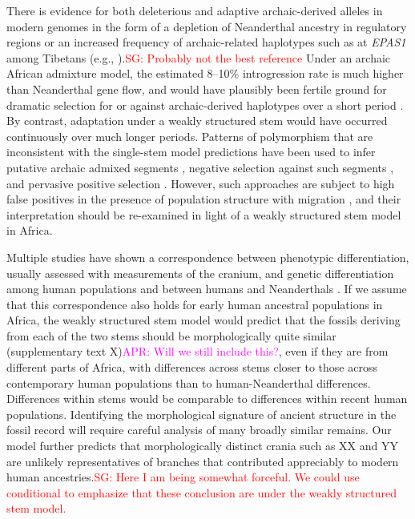 \documentclass[]{article}
\newcommand{\sgcomment}[1]{{\textcolor{red}{SG: #1}}}
\newcommand{\aprcomment}[1]{{\textcolor{magenta}{APR: #1}}}
\begin{document}
There is evidence for both deleterious and adaptive archaic-derived alleles in
modern genomes in the form of a depletion of Neanderthal ancestry in regulatory
regions \citep{Petr2019-xo} or an increased frequency of archaic-related
haplotypes such as at \emph{EPAS1} among Tibetans (e.g.,
\citet{Zhang2021-xx}).\sgcomment{Probably not the best reference} Under an
archaic African admixture model, the estimated 8--10\% introgression rate is
much higher than Neanderthal gene flow, and would have plausibly been fertile
ground for dramatic selection for or against archaic-derived haplotypes over a
short period \citep{Wall2019-ao}. By contrast, adaptation under a weakly
structured stem would have occurred continuously over much longer periods.
Patterns of polymorphism that are inconsistent with the single-stem model
predictions have been used to infer putative archaic admixed segments
\citep{Plagnol2006-lt,Hsieh2016-gk,Wall2019-ao,Durvasula2020-td}, negative
selection against such segments \citep{Wall2019-ao}, and pervasive positive
selection \citep{Schrider2017-kl}. However, such approaches are subject to high
false positives in the presence of population structure with migration
\citep{Petr2019-xo}, and their interpretation should be re-examined in light of
a weakly structured stem model in Africa.

Multiple studies have shown a correspondence between phenotypic
differentiation, usually assessed with measurements of the cranium, and genetic
differentiation among human populations and between humans and Neanderthals
\citep{Relethford1994-mh,Weaver2008-ho,Von_Cramon-Taubadel2009-zb}. If we
assume that this correspondence also holds for early human ancestral
populations in Africa, the weakly structured stem model would predict that the
fossils deriving from each of the two stems should be morphologically quite
similar (supplementary text X)\aprcomment{Will we still include this?}, even if
they are from different parts of Africa, with differences across stems closer
to those across contemporary human populations than to human-Neanderthal
differences. Differences within stems would be comparable to differences within
recent human populations. Identifying the morphological signature of ancient
structure in the fossil record will require careful analysis of many broadly
similar remains. Our model further predicts that morphologically distinct
crania such as XX and YY are unlikely representatives of branches that
contributed appreciably to modern human ancestries.\sgcomment{Here I am being
somewhat forceful. We could use conditional to emphasize that these conclusion
are under the weakly structured stem model.}
\end{document}

